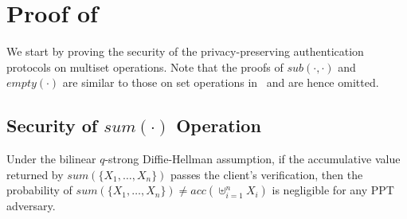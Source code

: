 \chapter{Proof of \texorpdfstring{}{Theorem~\ref{thm:aggregate-queries:sec}}}%
\label{app:aggregate-queries}

We start by proving the security of the privacy-preserving authentication protocols on multiset operations. Note that the proofs of $sub(\cdot, \cdot)$ and $empty(\cdot)$ are similar to those on set operations in~\cite{10.1007/978-3-642-22792-9_6} and are hence omitted.

\section{Security of $sum(\cdot)$ Operation}

\begin{lemma}\label{lem:aggregate-queries:sum}
  Under the bilinear $q$-strong Diffie-Hellman assumption, if the accumulative value returned by $sum(\{X_1,\dots,X_n\})$ passes the client's verification, then the probability of $sum(\{X_1,\dots,X_n\}) \neq acc(\uplus_{i=1}^n X_i)$ is negligible for any PPT adversary.
\end{lemma}

